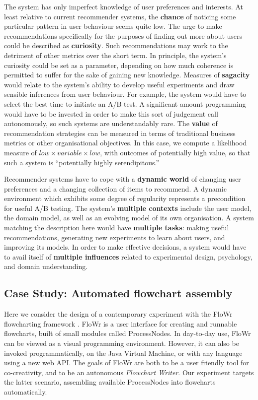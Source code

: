 The system has only imperfect knowledge of user preferences and
interests.  At least relative to current recommender systems, the
\textbf{chance} of noticing some particular pattern in user behaviour
seems quite low.  The urge to make recommendations specifically for
the purposes of finding out more about users could be described as
\textbf{curiosity}.  Such recommendations may work to the detriment of
other metrics over the short term.  In principle, the system's
curiosity could be set as a parameter, depending on how much coherence
is permitted to suffer for the sake of gaining new knowledge.
Measures of \textbf{sagacity} would relate to the system's ability to
develop useful experiments and draw sensible inferences from user
behaviour.  For example, the system would have to select the best time
to initiate an A/B test.  A significant amount programming would have
to be invested in order to make this sort of judgement call
autonomously, so such systems are understandably rare.  The
\textbf{value} of recommendation strategies can be measured in terms
of traditional business metrics or other organisational objectives.
In this case, we compute a likelihood measure of
$\mathit{low}\times\mathit{variable}\times\mathit{low}$, with outcomes
of potentially high value, so that such a system is ``potentially
highly serendipitous.''

Recommender systems have to cope with a \textbf{dynamic world} of changing user preferences and a changing collection of items to recommend.  A dynamic environment which exhibits some degree of regularity represents a precondition for useful A/B testing.  The system's \textbf{multiple contexts} include the user model, the domain model, as well as an evolving model of its own organisation.  A system matching the description here would have \textbf{multiple tasks}: making useful recommendations, generating new experiments to learn about users, and improving its models.  In order to make effective decisions, a system would have to avail itself of \textbf{multiple influences} related to experimental design, psychology, and domain understanding.

\subsection{Case Study: Automated flowchart assembly} \label{sec:flowchartassembly}

Here we consider the design of a contemporary experiment with the
{\sf FloWr} flowcharting framework \cite{colton-flowcharting}.  {\sf FloWr} is a
user interface for creating and runnable flowcharts, built of small
modules called ProcessNodes.  In day-to-day use, {\sf FloWr} can be viewed
as a visual programming environment.  However, it can also be invoked
programmatically, on the Java Virtual Machine, or with any language
using a new web API.  The goals of {\sf FloWr} are both to be a user
friendly tool for co-creativity, and to be an autonomous
\emph{Flowchart Writer}.  Our experiment targets the latter scenario,
assembling available ProcessNodes into flowcharts automatically.

